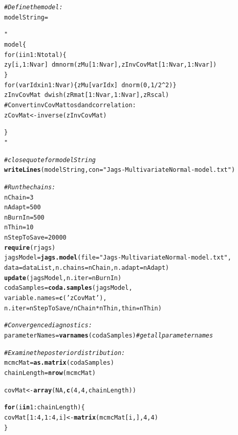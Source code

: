 \documentclass[11pt,a4paper,twoside]{book}\usepackage[]{graphicx}\usepackage[]{color}
\makeatletter
\newcommand{\hlnum}[1]{\textcolor[rgb]{0.686,0.059,0.569}{#1}}%
\newcommand{\hlstr}[1]{\textcolor[rgb]{0.192,0.494,0.8}{#1}}%
\newcommand{\hlcom}[1]{\textcolor[rgb]{0.678,0.584,0.686}{\textit{#1}}}%
\newcommand{\hlopt}[1]{\textcolor[rgb]{0,0,0}{#1}}%
\newcommand{\hlstd}[1]{\textcolor[rgb]{0.345,0.345,0.345}{#1}}%
\newcommand{\hlkwa}[1]{\textcolor[rgb]{0.161,0.373,0.58}{\textbf{#1}}}%
\newcommand{\hlkwb}[1]{\textcolor[rgb]{0.69,0.353,0.396}{#1}}%
\newcommand{\hlkwc}[1]{\textcolor[rgb]{0.333,0.667,0.333}{#1}}%
\newcommand{\hlkwd}[1]{\textcolor[rgb]{0.737,0.353,0.396}{\textbf{#1}}}%
\newenvironment{kframe}{%
 \def\at@end@of@kframe{}%
 \ifinner\ifhmode%
  \def\at@end@of@kframe{\end{minipage}}%
  \begin{minipage}{\columnwidth}%
 \fi\fi%
 \def\FrameCommand##1{\hskip\@totalleftmargin \hskip-\fboxsep
 \colorbox{shadecolor}{##1}\hskip-\fboxsep
     \hskip-\linewidth \hskip-\@totalleftmargin \hskip\columnwidth}%
 \MakeFramed {\advance\hsize-\width
   \@totalleftmargin\z@ \linewidth\hsize
   \@setminipage}}%
 {\par\unskip\endMakeFramed%
 \at@end@of@kframe}
\newenvironment{knitrout}{}{} %
\makeatother
\begin{document}
\begin{knitrout}
\begin{kframe}
\begin{alltt}
\hlcom{# Define the model:}
\hlstd{modelString} \hlkwb{=} \hlstr{"
model \{
for ( i in 1:Ntotal ) \{
zy[i,1:Nvar] ~ dmnorm( zMu[1:Nvar] , zInvCovMat[1:Nvar,1:Nvar] ) 
\}
for ( varIdx in 1:Nvar ) \{ zMu[varIdx] ~ dnorm( 0 , 1/2^2 ) \}
zInvCovMat ~ dwish( zRmat[1:Nvar,1:Nvar] , zRscal )
# Convert invCovMat to sd and correlation:
zCovMat <- inverse( zInvCovMat )

\}
"} \hlcom{# close quote for modelString}
\hlkwd{writeLines}\hlstd{( modelString ,} \hlkwc{con}\hlstd{=}\hlstr{"Jags-MultivariateNormal-model.txt"} \hlstd{)}

\hlcom{# Run the chains:}
\hlstd{nChain} \hlkwb{=} \hlnum{3}
\hlstd{nAdapt} \hlkwb{=} \hlnum{500}
\hlstd{nBurnIn} \hlkwb{=} \hlnum{500}
\hlstd{nThin} \hlkwb{=} \hlnum{10}
\hlstd{nStepToSave} \hlkwb{=} \hlnum{20000}
\hlkwd{require}\hlstd{(rjags)}
\hlstd{jagsModel} \hlkwb{=} \hlkwd{jags.model}\hlstd{(} \hlkwc{file}\hlstd{=}\hlstr{"Jags-MultivariateNormal-model.txt"} \hlstd{,}
                                                                                                \hlkwc{data}\hlstd{=dataList ,} \hlkwc{n.chains}\hlstd{=nChain ,} \hlkwc{n.adapt}\hlstd{=nAdapt )}
\hlkwd{update}\hlstd{( jagsModel ,} \hlkwc{n.iter}\hlstd{=nBurnIn )}
\hlstd{codaSamples} \hlkwb{=} \hlkwd{coda.samples}\hlstd{( jagsModel ,}
                                                                                                                \hlkwc{variable.names}\hlstd{=}\hlkwd{c}\hlstd{(}\hlstr{'zCovMat'}\hlstd{) ,}
                                                                                                                \hlkwc{n.iter}\hlstd{=nStepToSave}\hlopt{/}\hlstd{nChain}\hlopt{*}\hlstd{nThin ,} \hlkwc{thin}\hlstd{=nThin )}


\hlcom{# Convergence diagnostics:}
\hlstd{parameterNames} \hlkwb{=} \hlkwd{varnames}\hlstd{(codaSamples)} \hlcom{# get all parameter names}


\hlcom{# Examine the posterior distribution:}
\hlstd{mcmcMat} \hlkwb{=} \hlkwd{as.matrix}\hlstd{(codaSamples)}
\hlstd{chainLength} \hlkwb{=} \hlkwd{nrow}\hlstd{(mcmcMat)}

\hlstd{covMat} \hlkwb{<-} \hlkwd{array}\hlstd{(}\hlnum{NA}\hlstd{,} \hlkwd{c}\hlstd{(}\hlnum{4}\hlstd{,}\hlnum{4}\hlstd{,chainLength))}

\hlkwa{for} \hlstd{(i} \hlkwa{in} \hlnum{1}\hlopt{:}\hlstd{chainLength)\{}
\hlstd{covMat[}\hlnum{1}\hlopt{:}\hlnum{4}\hlstd{,}\hlnum{1}\hlopt{:}\hlnum{4}\hlstd{,i]}\hlkwb{<-}\hlkwd{matrix}\hlstd{(mcmcMat[i,],} \hlnum{4}\hlstd{,} \hlnum{4}\hlstd{)}
\hlstd{\}}


\end{alltt}
\end{kframe}
\end{knitrout}
\end{document}
